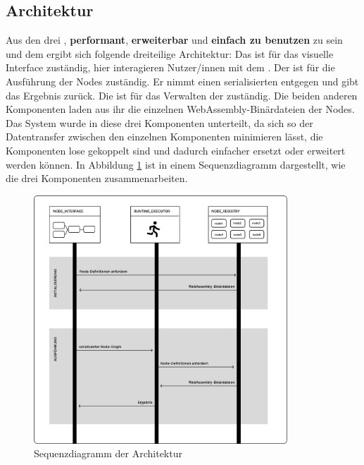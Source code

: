 \documentclass[ngerman]{article}
\begin{document}
\pagebreak


\subsection{Architektur}
\label{sec:Architektur}
Aus den drei , \textbf{performant}, \textbf{erweiterbar} und \textbf{einfach zu benutzen} zu sein und dem  ergibt sich folgende dreiteilige Architektur:
\br
Das \textbf{} ist für das visuelle Interface zuständig, hier interagieren Nutzer/innen mit dem .
\br
Der \textbf{} ist für die Ausführung der Nodes zuständig. Er nimmt einen serialisierten  entgegen und gibt das Ergebnis zurück.
\br
Die \textbf{} ist für das Verwalten der  zuständig. Die beiden anderen Komponenten laden aus ihr die einzelnen WebAssembly-Binärdateien der Nodes.
\br
Das System wurde in diese drei Komponenten unterteilt, da sich so der Datentransfer zwischen den einzelnen Komponenten minimieren lässt, die Komponenten lose gekoppelt sind und dadurch einfacher ersetzt oder erweitert werden können.
In Abbildung \ref{fig:overview_sequence} ist in einem Sequenzdiagramm dargestellt, wie die drei Komponenten zusammenarbeiten.

\begin{figure}[hbtp]
    \centering
    \includegraphics[width=0.85\textwidth]{graphics/OVERVIEW_SEQUENCE.pdf}
    \caption{Sequenzdiagramm der Architektur}
    \label{fig:overview_sequence}
\end{figure}
\end{document}
